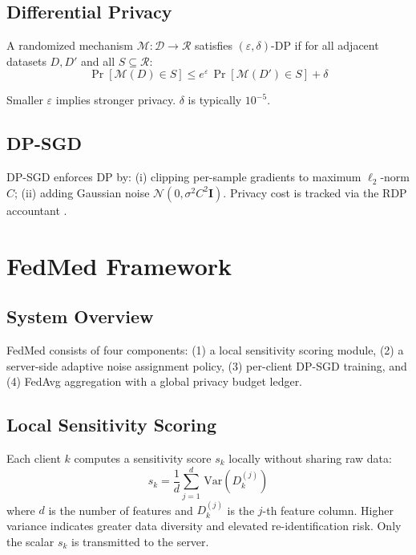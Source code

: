 \documentclass[journal]{IEEEtran}
\begin{document}
\subsection{Differential Privacy}
\begin{definition}
A randomized mechanism $\mathcal{M}:\mathcal{D}\to\mathcal{R}$ satisfies
$(\varepsilon,\delta)$-DP if for all adjacent datasets $D,D'$ and all
$S\subseteq\mathcal{R}$:
\begin{equation}
  \Pr[\mathcal{M}(D)\in S]\leq e^\varepsilon\,\Pr[\mathcal{M}(D')\in S]+\delta
  \label{eq:dp}
\end{equation}
\end{definition}
Smaller $\varepsilon$ implies stronger privacy. $\delta$ is typically $10^{-5}$.

\subsection{DP-SGD}
DP-SGD \cite{abadi2016} enforces DP by: (i) clipping per-sample gradients to
maximum $\ell_2$-norm $C$; (ii) adding Gaussian noise
$\mathcal{N}(0,\sigma^2 C^2\mathbf{I})$. Privacy cost is tracked via the RDP
accountant \cite{mironov2017}.

\section{FedMed Framework}
\label{sec:method}

\subsection{System Overview}
FedMed consists of four components: (1) a local sensitivity scoring module,
(2) a server-side adaptive noise assignment policy, (3) per-client DP-SGD
training, and (4) FedAvg aggregation with a global privacy budget ledger.

\subsection{Local Sensitivity Scoring}
Each client $k$ computes a sensitivity score $s_k$ locally without sharing
raw data:
\begin{equation}
  s_k = \frac{1}{d}\sum_{j=1}^{d}\,\mathrm{Var}\!\left(D_k^{(j)}\right)
  \label{eq:score}
\end{equation}
where $d$ is the number of features and $D_k^{(j)}$ is the $j$-th feature
column. Higher variance indicates greater data diversity and elevated
re-identification risk. Only the scalar $s_k$ is transmitted to the server.
\end{document}
